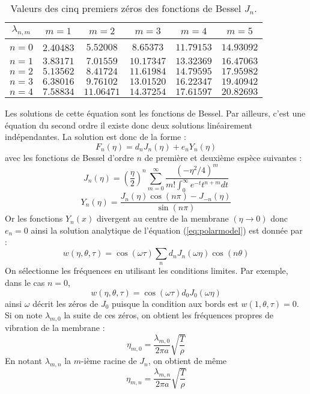 \documentclass[a4,12pt]{article}
\begin{document}
    \begin{table}
    \begin{center}
    \begin{tabular}{|c|c|c|c|c|c|}
    \hline
    $\lambda_{n,m}$&$m=1$  &$m=2$ & $m=3$ &$ m=4$&$m=5$\\
        \hline
        $n=0$&2.40483&$5.52008$&$8.65373$&$11.79153$&$14.93092$\\
           \hline
           $n=1$&$3.83171$&$7.01559$&$10.17347$&$13.32369$&$16.47063$\\
              \hline
              $n=2$&$5.13562$&$8.41724$&$11.61984$&$14.79595$&$17.95982$\\
                 \hline
                 $n=3$&$6.38016$&$9.76102$&$13.01520$&$16.22347$&$19.40942$\\
                    \hline
                    $n=4$&$7.58834$&$11.06471$&$14.37254$&$17.61597$&$20.82693$\\
                       \hline
                       \end{tabular}
                       \caption{Valeurs des cinq premiers zéros des fonctions de Bessel $J_n$.}
                       \end{center}
                       \end{table}

                       Les solutions de cette équation sont les fonctions de Bessel. Par ailleurs, c'est une équation du second ordre il existe donc deux solutions linéairement indépendantes. La solution est donc de la forme :
    \[
F_n(\eta)=d_nJ_n(\eta)+e_nY_n(\eta)
    \]
    avec les fonctions de Bessel d'ordre $n$ de première et deuxième espèce suivantes :
    \[
    J_n(\eta)=\left(\dfrac{\eta}{2}\right)^n\sum_{m=0}^{\infty} \dfrac{(-\eta^2/4)^m}{m!\int_0^{\infty}e^{-t}t^{n+m}dt}
    \]
    \[
    Y_n(\eta)=\dfrac{J_n(\eta)\cos(n\pi)-J_{-n}(\eta)}{\sin(n\pi)}
    \]
    Or les fonctions $Y_n(x)$ divergent au centre de la membrane $(\eta\rightarrow 0)$ donc $e_n=0$
    ainsi la solution analytique de l'équation (\ref{eq:polarmodel}) est donnée par :
    \[
w(\eta,\theta,\tau)=\cos(\omega \tau)\sum_n d_nJ_n(\omega\eta)\cos(n\theta)
    \]
    On sélectionne les fréquences en utilisant les conditions limites. Par exemple, dans le cas $n=0$, 
    \[
w(\eta,\theta,\tau)=\cos(\omega \tau) d_0J_0(\omega \eta)
    \]
    ainsi $\omega$ décrit les zéros de $J_0$ puisque la condition aux bords est $w(1,\theta,\tau)=0$. Si on note $\lambda_{m,0}$ la suite de ces zéros, on obtient les fréquences propres de vibration de la membrane :
    \[
    \eta_{m,0}=\dfrac{\lambda_{m,0}}{2\pi a} \sqrt{\frac{T}{\rho}}
    \]
    En notant $\lambda_{m,n}$ la $m$-ième racine de $J_n$, on obtient de même 
    \[
    \eta_{m,n}=\dfrac{\lambda_{m,n}}{2\pi a} \sqrt{\frac{T}{\rho}}
    \]
\end{document}
